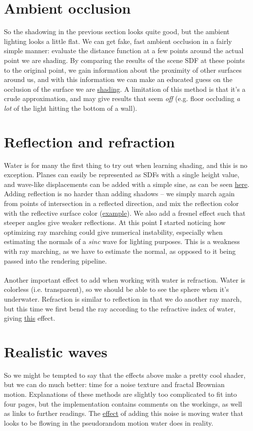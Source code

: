 \documentclass[abstract=off,oneside]{scrreprt}
\begin{document}
\section*{Ambient occlusion}
\label{sec-7}
\label{sec:ao}
So the shadowing in the previous section looks quite good, but the
ambient lighting looks a little flat. We can get fake, fast ambient
occlusion in a fairly simple manner: evaluate the distance function at
a few points around the actual point we are shading. By comparing the
results of the scene SDF at these points to the original point, we
gain information about the proximity of other surfaces around us, and
with this information we can make an educated guess on the occlusion
of the surface we are \hyperref[fig:ao]{shading}. A limitation of this method is that
it's a crude approximation, and may give results that seem \emph{off}
(e.g. floor occluding \emph{a lot} of the light hitting the bottom of a
wall).

\section*{Reflection and refraction}
\label{sec-8}
\label{sec:water}
Water is for many the first thing to try out when learning shading,
and this is no exception. Planes can easily be represented as SDFs
with a single height value, and wave-like displacements can be added
with a simple sine, as can be seen \hyperref[fig:simplewater]{here}. Adding reflection is no
harder than adding shadows -- we simply march again from points of
intersection in a reflected direction, and mix the reflection color
with the reflective surface color (\hyperref[fig:reflection]{example}). We also add a fresnel
effect such that steeper angles give weaker reflections. At this point
I started noticing how optimizing ray marching could give numerical
instability, especially when estimating the normals of a \emph{sinc} wave
for lighting purposes. This is a weakness with ray marching, as we
have to estimate the normal, as opposed to it being passed into the
rendering pipeline.
\\\\
Another important effect to add when working with water is
refraction. Water is colorless (i.e. transparent), so we should be
able to see the sphere when it's underwater. Refraction is similar to
reflection in that we do another ray march, but this time we first
bend the ray according to the refractive index of water, giving
\hyperref[fig:refraction]{this} effect.

\section*{Realistic waves}
\label{sec-9}
\label{sec:realisticwaves}
So we might be tempted to say that the effects above make a pretty
cool shader, but we can do much better: time for a noise texture and
fractal Brownian motion. Explanations of these methods are slightly
too complicated to fit into four pages, but the implementation
contains comments on the workings, as well as links to further
readings. The \hyperref[fig:noise]{effect} of adding this noise is moving water that
looks to be flowing in the pseudorandom motion water does in reality.
\end{document}
